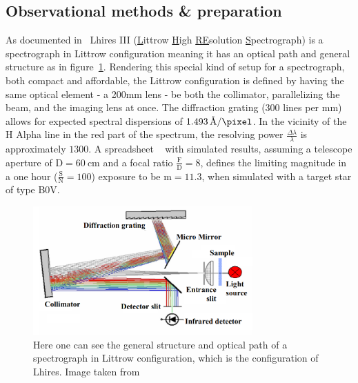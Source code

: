 \documentclass{article}
\begin{document}
\subsection{Observational methods \& preparation}
\label{ss:1}
As documented in~\parencite{Shelyak_Instruments} Lhires III (\underline{L}ittrow \underline{H}igh \underline{RE}solution \underline{S}pectrograph) is a spectrograph in Littrow configuration meaning it has an optical path and general structure as in figure~\ref{fig:1}. Rendering this special kind of setup for a spectrograph, both compact and affordable, the Littrow configuration is defined by having the same optical element - a 200mm lens - be both the collimator, parallelizing the beam, and the imaging lens at once. The diffraction grating (300 lines per mm) allows for expected spectral dispersions of $\SI{1.493}{\angstrom\per\pixel}$. In the vicinity of the H Alpha line in the red part of the spectrum, the resolving power $\frac{\Delta\lambda}{\lambda}$ is approximately $1300$. A spreadsheet ~\parencite{Shelyak_Instruments} with simulated results, assuming a telescope aperture of $\text{D}=\SI{60}{\cm}$ and a focal ratio $\frac{\text{F}}{\text{D}}=8$, defines the limiting magnitude in a one hour ($\frac{\text{S}}{\text{N}}=\num{100}$) exposure to be $\text{m}=\num{11.3}$, when simulated with a target star of type B0V.\\
\begin{figure}[H]
	\centering
	\includegraphics[width=0.75\textwidth]{spectroscopy/littrow.png}
	\caption{Here one can see the general structure and optical path of a spectrograph in Littrow configuration, which is the configuration of Lhires. Image taken from~\parencite{Annual_Report_TU_Chemnitz}}
	\label{fig:1}
\end{figure}
\end{document}
